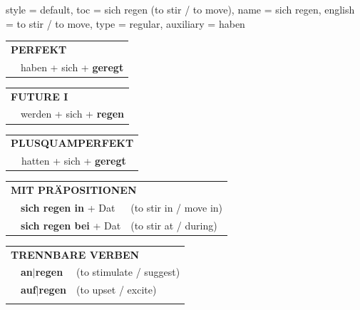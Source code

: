 \begin{verbentry}{
  style = {default},
  toc = {sich regen (to stir / to move)},
  name = {sich regen},
  english = {to stir / to move},
  type = {regular},
  auxiliary = {haben}
}
 \begin{tabular}{rl}
     \multicolumn{2}{l}{\textbf{PERFEKT}}\\
   & haben + sich + \textbf{geregt}\\
  \end{tabular}
\hfill
   \begin{tabular}{rl}
    \multicolumn{2}{l}{\textbf{FUTURE I} }\\
   & werden + sich + \textbf{regen}\\
  \end{tabular}
\hfill
   \begin{tabular}{rl}
      \multicolumn{2}{l}{\textbf{PLUSQUAMPERFEKT}}\\
   & hatten + sich + \textbf{geregt}\\
  \end{tabular}

   \vspace{10pt}

   \begin{tabular}{lll}
      \multicolumn{3}{l}{\textbf{MIT PRÄPOSITIONEN}}\\
& \textbf{sich regen in} + Dat & (to stir in / move in)\\
& \textbf{sich regen bei} + Dat & (to stir at / during)\\
\end{tabular}
  \hfill
   \begin{tabular}{lll}
      \multicolumn{3}{l}{\textbf{TRENNBARE VERBEN}}\\
 & \textbf{an$|$regen} & (to stimulate / suggest)\\
 & \textbf{auf$|$regen} & (to upset / excite)\\
\vspace{10pt}
  \end{tabular}

  \vspace{-5pt}
\end{verbentry}


